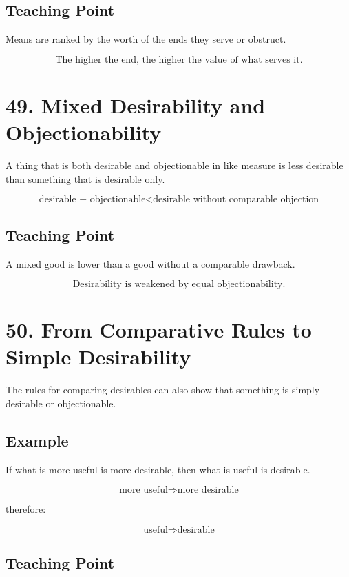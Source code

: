 \documentclass[12pt]{article}
\begin{document}
\subsection*{Teaching Point}

Means are ranked by the worth of the ends they serve or obstruct.

\[
\boxed{
\text{The higher the end, the higher the value of what serves it.}
}
\]

\section*{49. Mixed Desirability and Objectionability}

A thing that is both desirable and objectionable in like measure is less
desirable than something that is desirable only.

\[
\text{desirable + objectionable}
<
\text{desirable without comparable objection}
\]

\subsection*{Teaching Point}

A mixed good is lower than a good without a comparable drawback.

\[
\boxed{
\text{Desirability is weakened by equal objectionability.}
}
\]

\section*{50. From Comparative Rules to Simple Desirability}

The rules for comparing desirables can also show that something is simply
desirable or objectionable.

\subsection*{Example}

If what is more useful is more desirable, then what is useful is desirable.

\[
\text{more useful} \Rightarrow \text{more desirable}
\]

therefore:

\[
\text{useful} \Rightarrow \text{desirable}
\]

\subsection*{Teaching Point}
\end{document}

